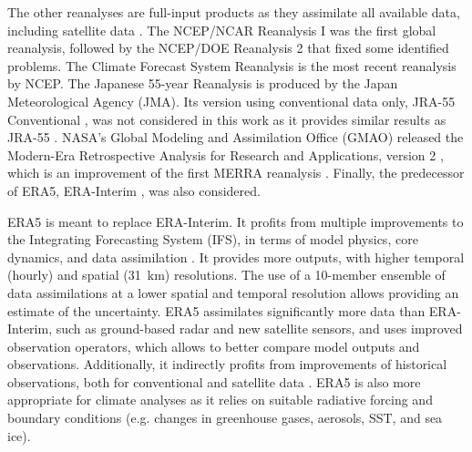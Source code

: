 \documentclass[alpha-refs]{wiley-article}
\begin{document}
The other reanalyses are full-input products as they assimilate all available data, including satellite data \citep{Fujiwara2017}. The NCEP/NCAR Reanalysis I \citep[NR-1 --][]{Kalnay1996, Kistler2001} was the first global reanalysis, followed by the NCEP/DOE Reanalysis 2 \citep[NR-2 --][]{Kanamitsu2002} that fixed some identified problems. The Climate Forecast System Reanalysis \citep[CFSR --][]{Saha2010a} is the most recent reanalysis by NCEP. The Japanese 55-year Reanalysis \citep[JRA-55 --][]{Kobayashi2015, Harada2016} is produced by the Japan Meteorological Agency (JMA). Its version using conventional data only, JRA-55 Conventional \citep[JRA-55C --][]{Kobayashi2014}, was not considered in this work as it provides similar results as JRA-55 \citep{Horton2018b}. NASA's Global Modeling and Assimilation Office (GMAO) released the Modern-Era Retrospective Analysis for Research and Applications, version 2 \citep[MERRA-2 -- ][]{Gelaro2017}, which is an improvement of the first MERRA reanalysis \citep{Rienecker2011}. Finally, the predecessor of ERA5, ERA-Interim \citep[ERA-INT --][]{Dee2011a}, was also considered.

ERA5 \citep{Hersbach2019} is meant to replace ERA-Interim. It profits from multiple improvements to the Integrating Forecasting System (IFS), in terms of model physics, core dynamics, and data assimilation \citep{Hersbach2019}. It provides more outputs, with higher temporal (hourly) and spatial (31~km) resolutions. The use of a 10-member ensemble of data assimilations at a lower spatial and temporal resolution allows providing an estimate of the uncertainty. ERA5 assimilates significantly more data than ERA-Interim, such as ground-based radar and new satellite sensors, and uses improved observation operators, which allows to better compare model outputs and observations. Additionally, it indirectly profits from improvements of historical observations, both for conventional and satellite data \citep{Hersbach2019}. ERA5 is also more appropriate for climate analyses as it relies on suitable radiative forcing and boundary conditions (e.g. changes in greenhouse gases, aerosols, SST, and sea ice).


\end{document}
